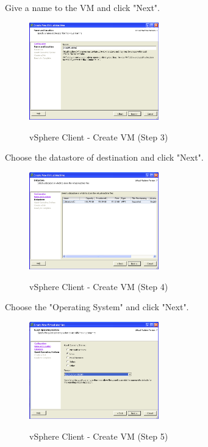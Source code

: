 Give a name to the VM and click "Next".
\begin{figure}[ht]
	\caption{vSphere Client - Create VM (Step 3)}
  	\centering
	\includegraphics[width=0.5\textwidth]{./pic/createvm_3.png}
	\label{fig:createvm_3}
\end{figure}

\pagebreak
Choose the datastore of destination and click "Next".
\begin{figure}[ht]
	\caption{vSphere Client - Create VM (Step 4)}
  	\centering
	\includegraphics[width=0.5\textwidth]{./pic/createvm_4.png}
	\label{fig:createvm_4}
\end{figure}

Choose the "Operating System" and click "Next".
\begin{figure}[ht]
	\caption{vSphere Client - Create VM (Step 5)}
  	\centering
	\includegraphics[width=0.5\textwidth]{./pic/createvm_5.png}
	\label{fig:createvm_5}
\end{figure}

